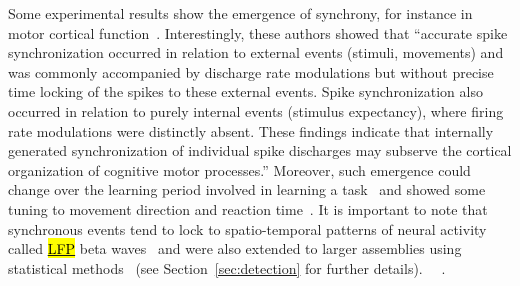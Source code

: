 \documentclass[brainsci, %
               review,accept,pdftex,moreauthors
               ]{Definitions/mdpi}
\begin{document}
Some experimental results show the emergence of synchrony, for instance in motor cortical function~\citep{riehle_spike_1997}. Interestingly, these authors showed that ``accurate spike synchronization occurred in relation to external events (stimuli, movements) and was commonly accompanied by discharge rate modulations but without precise time locking of the spikes to these external events. Spike synchronization also occurred in relation to purely internal events (stimulus expectancy), where firing rate modulations were distinctly absent. These findings indicate that internally generated synchronization of individual spike discharges may subserve the cortical organization of cognitive motor processes.'' Moreover, such emergence could change over the learning period involved in learning a task~\citep{kilavik_long-term_2009} and showed some tuning to movement direction and reaction time~\citep{grammont_spike_2003}. It is important to note that synchronous events tend to lock to spatio-temporal patterns of neural activity called \href{https://en.wikipedia.org/wiki/Local_field_potential}{\hl{LFP}} beta waves~\citep{denker_lfp_2018} and were also extended to larger assemblies using statistical methods~\citep{torre_asset_2016} (see Section~\ref{sec:detection} for further details). ~\citep{ben-yishai_traveling_1997}~\citep{bruno_cortex_2006}. 
\end{document}
